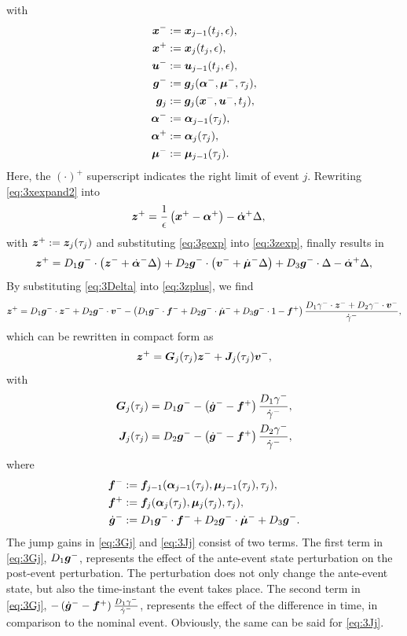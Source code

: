 \documentclass[../DC2017114Bouma.tex]{subfiles}
\begin{document}
with
\begin{align*}
{\boldsymbol{x}}^- &:= {\boldsymbol{x}}_{j-1}(t_{j},\epsilon),\\
{\boldsymbol{x}}^+ &:= {\boldsymbol{x}}_{j}(t_{j},\epsilon),\\
{\boldsymbol{u}}^- &:= {\boldsymbol{u}}_{j-1}(t_{j},\epsilon),\\
{\boldsymbol{g}}^- &:= {\boldsymbol{g}}_j(\boldsymbol{\alpha}^-,\boldsymbol{\mu}^-,\tau_j),\\
{\boldsymbol{g}}_j &:= {\boldsymbol{g}}_j({\boldsymbol{x}}^-,{\boldsymbol{u}}^-,t_j),\\
\boldsymbol{\alpha}^- &:= \boldsymbol{\alpha}_{j-1}(\tau_j),\\
\boldsymbol{\alpha}^+ &:= \boldsymbol{\alpha}_j(\tau_j),\\
\boldsymbol{\mu}^- &:= \boldsymbol{\mu}_{j-1}(\tau_j).
\end{align*}
Here, the $(\cdot)^+$ superscript indicates the right limit of event $j$. Rewriting \eqref{eq:3xexpand2} into
\begin{align}
{\boldsymbol{z}}^+ &= \frac{1}{\epsilon}\left({\boldsymbol{x}}^{+} - \boldsymbol{\alpha}^+\right) -\dot{\boldsymbol{\alpha}}^+\Delta,\label{eq:3zexp}
\end{align}
with ${\boldsymbol{z}}^+ := {\boldsymbol{z}}_j(\tau_j)$ and substituting \eqref{eq:3gexp} into \eqref{eq:3zexp}, finally results in
\begin{equation}
{\boldsymbol{z}}^+ = D_1{\boldsymbol{g}}^-\cdot\left({\boldsymbol{z}}^- + \dot{\boldsymbol{\alpha}}^-\Delta\right) + D_2{\boldsymbol{g}}^-\cdot\left({\boldsymbol{v}}^- + \dot{\boldsymbol{\mu}}^-\Delta\right) + D_3{\boldsymbol{g}}^-\cdot\Delta - \dot{\boldsymbol{\alpha}}^+\Delta,\label{eq:3zplus}
\end{equation}
By substituting \eqref{eq:3Delta} into \eqref{eq:3zplus}, we find
\begin{align}
{\boldsymbol{z}}^+ = D_1{\boldsymbol{g}}^-\cdot{\boldsymbol{z}}^- + D_2{\boldsymbol{g}}^-\cdot{\boldsymbol{v}}^- - \left(D_1{\boldsymbol{g}}^-\cdot {\boldsymbol{f}}^- + D_2{\boldsymbol{g}}^-\cdot\dot{\boldsymbol{\mu}}^- + D_3{\boldsymbol{g}}^-\cdot 1 - {\boldsymbol{f}}^+\right)\frac{D_1\gamma^-\cdot{\boldsymbol{z}}^- + D_2\gamma^-\cdot{\boldsymbol{v}}^-}{\dot{\gamma}^-},
\end{align}
which can be rewritten in compact form as
\begin{align}
{\boldsymbol{z}}^+ = {\boldsymbol{G}}_j(\tau_j){\boldsymbol{z}}^- + {\boldsymbol{J}}_j(\tau_j){\boldsymbol{v}}^-,\label{eq:3zbplus}
\end{align}
with 
\begin{align}
{\boldsymbol{G}}_j(\tau_j) & = D_1{\boldsymbol{g}}^- - \left(\dot{{\boldsymbol{g}}}^- - {\boldsymbol{f}}^+\right)\frac{D_1\gamma^-}{\dot{\gamma}^-},\label{eq:3Gj}\\
{\boldsymbol{J}}_j(\tau_j) & = D_2{\boldsymbol{g}}^- - \left(\dot{{\boldsymbol{g}}}^- - {\boldsymbol{f}}^+\right)\frac{D_2\gamma^-}{\dot{\gamma}^-},\label{eq:3Jj}
\end{align}
where
\begin{align*}
{\boldsymbol{f}}^- &:= {\boldsymbol{f}}_{j-1}(\boldsymbol{\alpha}_{j-1}(\tau_j),\boldsymbol{\mu}_{j-1}(\tau_j),\tau_j),\\
{\boldsymbol{f}}^+ &:= {\boldsymbol{f}}_j(\boldsymbol{\alpha}_j(\tau_j),\boldsymbol{\mu}_j(\tau_j),\tau_j),\\
\dot{{\boldsymbol{g}}}^- &:= D_1{\boldsymbol{g}}^-\cdot {\boldsymbol{f}}^- + D_2{\boldsymbol{g}}^-\cdot \dot{\boldsymbol{\mu}}^- + D_3{\boldsymbol{g}}^-.
\end{align*}
The jump gains in \eqref{eq:3Gj} and \eqref{eq:3Jj} consist of two terms. The first term in \eqref{eq:3Gj}, $D_1{\boldsymbol{g}}^-$, represents the effect of the ante-event state perturbation on the post-event perturbation. The perturbation does not only change the ante-event state, but also the time-instant the event takes place. The second term in \eqref{eq:3Gj}, $- \left(\dot{{\boldsymbol{g}}}^- - {\boldsymbol{f}}^+\right)\frac{D_1\gamma^-}{\dot{\gamma}^-}$, represents the effect of the difference in time, in comparison to the nominal event. Obviously, the same can be said for \eqref{eq:3Jj}.
\end{document}
